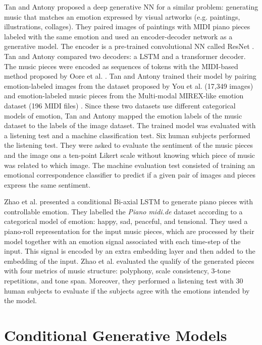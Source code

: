 Tan and Antony \cite{tan2020automated} proposed a deep generative NN for a similar problem: generating music that matches an emotion expressed by visual artworks (e.g. paintings, illustrations, collages). They paired images of paintings with MIDI piano pieces labeled with the same emotion and used an encoder-decoder network as a generative model. The encoder is a pre-trained convolutional NN called ResNet \cite{}. Tan and Antony \cite{tan2020automated} compared two decoders: a LSTM and a transformer decoder.
The music pieces were encoded as sequences of tokens with the MIDI-based method proposed by Oore et al. \cite{oore2017learning}. Tan and Antony \cite{tan2020automated} trained their model by pairing emotion-labeled images from the dataset proposed by You et al. \cite{you2016building} (17,349 images) and emotion-labeled music pieces from the Multi-modal MIREX-like emotion dataset (196 MIDI files) \cite{panda2013multi}. Since these two datasets use different categorical models of emotion, Tan and Antony \cite{tan2020automated} mapped the emotion labels of the music dataset to the labels of the image dataset. The trained model was evaluated with a listening test and a machine classification test. Six human subjects performed the listening test. They were asked to evaluate the sentiment of the music pieces and the image ons a ten-point Likert scale without knowing which piece of music was related to which image. The machine evaluation test consisted of training an emotional correspondence classifier to predict if a given pair of images and pieces express the same sentiment.

Zhao et al. \cite{zhao2019emotional} presented a conditional Bi-axial LSTM \cite{} to generate piano pieces with controllable emotion. They labelled the \textit{Piano midi.de} dataset according to a categorical model of emotion: happy, sad, peaceful, and tensional. They used a piano-roll representation for the input music pieces, which are processed by their model together with an emotion signal associated with each time-step of the input. This signal is encoded by an extra embedding layer and then added to the embedding of the input. Zhao et al. \cite{zhao2019emotional} evaluated the qualify of the generated pieces with four metrics of music structure: polyphony, scale consistency, 3-tone repetitions, and tone span. Moreover, they performed a listening test with 30 human subjects to evaluate if the subjects agree with the emotions intended by the model. 

\section{Conditional Generative Models}

